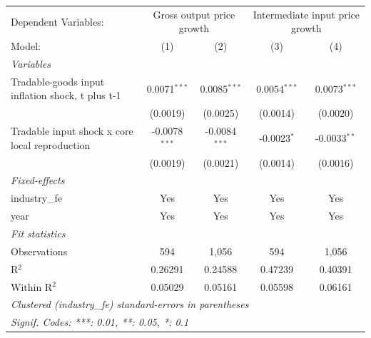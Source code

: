 \begingroup
\centering
\begin{tabular}{lcccc}
   \tabularnewline \midrule \midrule
   Dependent Variables: & \multicolumn{2}{c}{Gross output price growth} & \multicolumn{2}{c}{Intermediate input price growth}\\
   Model:                                           & (1)             & (2)             & (3)            & (4)\\  
   \midrule
   \emph{Variables}\\
   Tradable-goods input inflation shock, t plus t-1 & 0.0071$^{***}$  & 0.0085$^{***}$  & 0.0054$^{***}$ & 0.0073$^{***}$\\   
                                                    & (0.0019)        & (0.0025)        & (0.0014)       & (0.0020)\\   
   Tradable input shock x core local reproduction   & -0.0078$^{***}$ & -0.0084$^{***}$ & -0.0023$^{*}$  & -0.0033$^{**}$\\   
                                                    & (0.0019)        & (0.0021)        & (0.0014)       & (0.0016)\\   
   \midrule
   \emph{Fixed-effects}\\
   industry\_fe                                     & Yes             & Yes             & Yes            & Yes\\  
   year                                             & Yes             & Yes             & Yes            & Yes\\  
   \midrule
   \emph{Fit statistics}\\
   Observations                                     & 594             & 1,056           & 594            & 1,056\\  
   R$^2$                                            & 0.26291         & 0.24588         & 0.47239        & 0.40391\\  
   Within R$^2$                                     & 0.05029         & 0.05161         & 0.05598        & 0.06161\\  
   \midrule \midrule
   \multicolumn{5}{l}{\emph{Clustered (industry\_fe) standard-errors in parentheses}}\\
   \multicolumn{5}{l}{\emph{Signif. Codes: ***: 0.01, **: 0.05, *: 0.1}}\\
\end{tabular}
\par\endgroup
